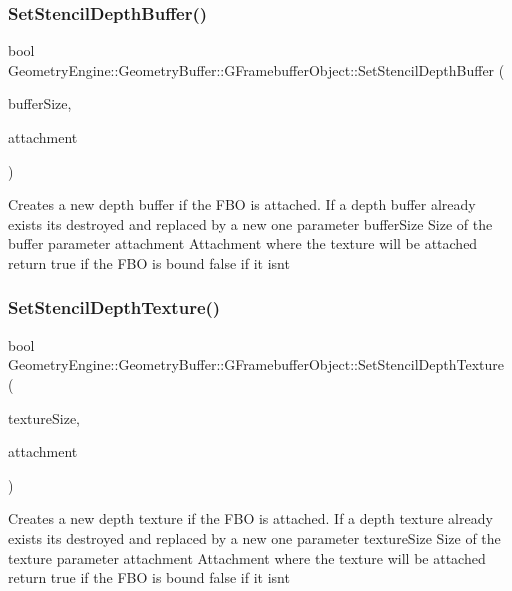 \subsubsection{\texorpdfstring{SetStencilDepthBuffer()}{SetStencilDepthBuffer()}}
{\footnotesize\ttfamily bool Geometry\+Engine\+::\+Geometry\+Buffer\+::\+G\+Framebuffer\+Object\+::\+Set\+Stencil\+Depth\+Buffer (\begin{DoxyParamCaption}\item[{const Q\+Vector2D \&}]{buffer\+Size,  }\item[{G\+Framebuffer\+Commons\+::\+G\+\_\+\+D\+E\+P\+T\+H\+\_\+\+S\+T\+E\+N\+C\+I\+L\+\_\+\+A\+T\+T\+A\+C\+H\+M\+E\+N\+TS}]{attachment }\end{DoxyParamCaption})}

Creates a new depth buffer if the F\+BO is attached. If a depth buffer already exists it\textquotesingle{}s destroyed and replaced by a new one parameter buffer\+Size Size of the buffer parameter attachment Attachment where the texture will be attached return true if the F\+BO is bound false if it isn\textquotesingle{}t \mbox{\label{class_geometry_engine_1_1_geometry_buffer_1_1_g_framebuffer_object_a91836ba52af64e57cd6a7d0f3fce118f}} 
\subsubsection{\texorpdfstring{SetStencilDepthTexture()}{SetStencilDepthTexture()}}
{\footnotesize\ttfamily bool Geometry\+Engine\+::\+Geometry\+Buffer\+::\+G\+Framebuffer\+Object\+::\+Set\+Stencil\+Depth\+Texture (\begin{DoxyParamCaption}\item[{const Q\+Vector2D \&}]{texture\+Size,  }\item[{G\+Framebuffer\+Commons\+::\+G\+\_\+\+D\+E\+P\+T\+H\+\_\+\+S\+T\+E\+N\+C\+I\+L\+\_\+\+A\+T\+T\+A\+C\+H\+M\+E\+N\+TS}]{attachment }\end{DoxyParamCaption})}

Creates a new depth texture if the F\+BO is attached. If a depth texture already exists it\textquotesingle{}s destroyed and replaced by a new one parameter texture\+Size Size of the texture parameter attachment Attachment where the texture will be attached return true if the F\+BO is bound false if it isn\textquotesingle{}t 

